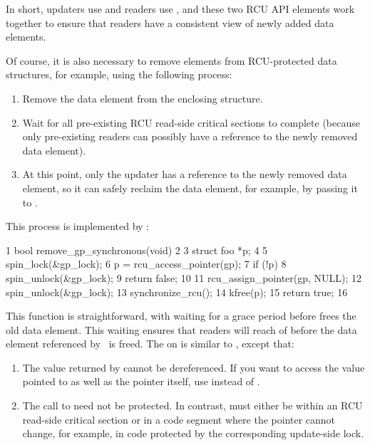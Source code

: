 In short, updaters use  and readers use
, and these two RCU API elements work together to
ensure that readers have a consistent view of newly added data elements.

Of course, it is also necessary to remove elements from RCU-protected
data structures, for example, using the following process:

\begin{enumerate}
\item Remove the data element from the enclosing structure.
\item Wait for all pre-existing RCU read-side critical sections to complete
   (because only pre-existing readers can possibly have a reference to
   the newly removed data element).
\item At this point, only the updater has a reference to the newly removed
   data element, so it can safely reclaim the data element, for example,
   by passing it to .
\end{enumerate}

This process is implemented by :

\begin{VerbatimN}
       1 bool remove_gp_synchronous(void)
       2 {
       3   struct foo *p;
       4
       5   spin_lock(&gp_lock);
       6   p = rcu_access_pointer(gp);
       7   if (!p) {
       8     spin_unlock(&gp_lock);
       9     return false;
      10   }
      11   rcu_assign_pointer(gp, NULL);
      12   spin_unlock(&gp_lock);
      13   synchronize_rcu();
      14   kfree(p);
      15   return true;
      16 }
\end{VerbatimN}

This function is straightforward, with \clnref{} %
waiting for a grace
period before \clnref %
frees the old data element.
This waiting ensures
that readers will reach \clnref{} %
of  before the data
element referenced by~ is freed.
The  on \clnref{} %
is similar to , except that:

\begin{enumerate}
\item The value returned by  cannot be
   dereferenced. If you want to access the value pointed to as well as
   the pointer itself, use  instead of
   .
\item The call to  need not be protected.
   In
   contrast,  must either be within an RCU
   read-side critical section or in a code segment where the pointer
   cannot change, for example, in code protected by the corresponding
   update-side lock.
\end{enumerate}

